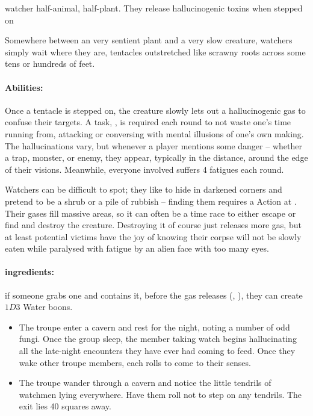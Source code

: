 \begin{multicols}{2}
\umberhulk

  {watcher}%
  {half-animal, half-plant. They release hallucinogenic toxins when stepped on}%

Somewhere between an very sentient plant and a very slow creature, watchers simply wait where they are, tentacles outstretched like scrawny roots across some tens or hundreds of feet.

\paragraph{Abilities:} Once a tentacle is stepped on, the creature slowly lets out a hallucinogenic gas to confuse their targets.
A  task, \tn[10], is required each round to not waste one's time running from, attacking or conversing with mental illusions of one's own making.
The hallucinations vary, but whenever a player mentions some danger -- whether a trap, monster, or enemy, they appear, typically in the distance, around the edge of their visions.
Meanwhile, everyone involved suffers 4 \glspl{fatigue} each round.

Watchers can be difficult to spot; they like to hide in darkened corners and pretend to be a shrub or a pile of rubbish -- finding them requires a  Action at \tn[10].
Their gases fill massive areas, so it can often be a time race to either escape or find and destroy the creature.
Destroying it of course just releases more gas, but at least potential victims have the joy of knowing their corpse will not be slowly eaten while paralysed with fatigue by an alien face with too many eyes.


\watcher

\paragraph{\Glspl{ingredient}:}
if someone grabs one and contains it, before the gas releases (, \tn[10]), they can create $1D3$ Water \glspl{boon}.

\showEnc[plant]

\begin{itemize}

  \item
  The troupe enter a cavern and rest for the night, noting a number of odd fungi.
  Once the group sleep, the member taking watch begins hallucinating all the late-night encounters they have ever had coming to feed.
  Once they wake other troupe members, each rolls to come to their senses.
  \item
  The troupe wander through a cavern and notice the little tendrils of watchmen lying everywhere.
  Have them roll  not to step on any tendrils.
  The exit lies 40 squares away.

\end{itemize}

\end{multicols}

